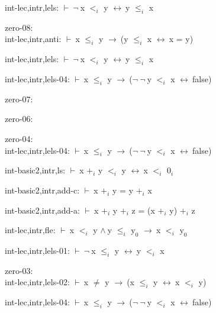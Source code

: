 \documentclass[a4paper]{article}
\newcommand{\Fol}{\mbox{$\vdash\ $}}
\newcommand{\Not}{\mbox{$\neg\ $}}
\newcommand{\And}{\mbox{$\wedge\ $}}
\newcommand{\Imp}{\mbox{$\rightarrow\ $}}
\newcommand{\Equiv}{\mbox{$\leftrightarrow\ $}}
\begin{document}
int-lec,intr,lels: 
 \Fol \Not x $\mbox{$<$}_{i}$ y \Equiv y $\mbox{$\le$}_{i}$ x



\bigskip

zero-08:\\ int-lec,intr,anti: 
 \Fol x $\mbox{$\le$}_{i}$ y \Imp (y $\mbox{$\le$}_{i}$ x \Equiv x = y)



int-lec,intr,lels: 
 \Fol \Not x $\mbox{$<$}_{i}$ y \Equiv y $\mbox{$\le$}_{i}$ x



int-lec,intr,lels-04: 
 \Fol x $\mbox{$\le$}_{i}$ y \Imp (\Not \Not y $\mbox{$<$}_{i}$ x \Equiv false)



\bigskip

zero-07:\\ 

\bigskip

zero-06:\\ 

\bigskip

zero-04:\\ int-lec,intr,lels-04: 
 \Fol x $\mbox{$\le$}_{i}$ y \Imp (\Not \Not y $\mbox{$<$}_{i}$ x \Equiv false)



int-basic2,intr,ls: 
 \Fol x $\mbox{+}_{i}$ y $\mbox{$<$}_{i}$ y \Equiv x $\mbox{$<$}_{i}$ $\mbox{0}_{i}$



int-basic2,intr,add-c: 
 \Fol x $\mbox{+}_{i}$ y = y $\mbox{+}_{i}$ x



int-basic2,intr,add-a: 
 \Fol x $\mbox{+}_{i}$ y $\mbox{+}_{i}$ z = (x $\mbox{+}_{i}$ y) $\mbox{+}_{i}$ z



int-lec,intr,fle: 
 \Fol x $\mbox{$<$}_{i}$ y \And y $\mbox{$\le$}_{i}$ $\mbox{y}_{0}$ \Imp x $\mbox{$<$}_{i}$ $\mbox{y}_{0}$



int-lec,intr,lels-01: 
 \Fol \Not x $\mbox{$\le$}_{i}$ y \Equiv y $\mbox{$<$}_{i}$ x



\bigskip

zero-03:\\ int-lec,intr,lels-02: 
 \Fol x $\neq$ y \Imp (x $\mbox{$\le$}_{i}$ y \Equiv x $\mbox{$<$}_{i}$ y)



int-lec,intr,lels-04: 
 \Fol x $\mbox{$\le$}_{i}$ y \Imp (\Not \Not y $\mbox{$<$}_{i}$ x \Equiv false)
\end{document}
